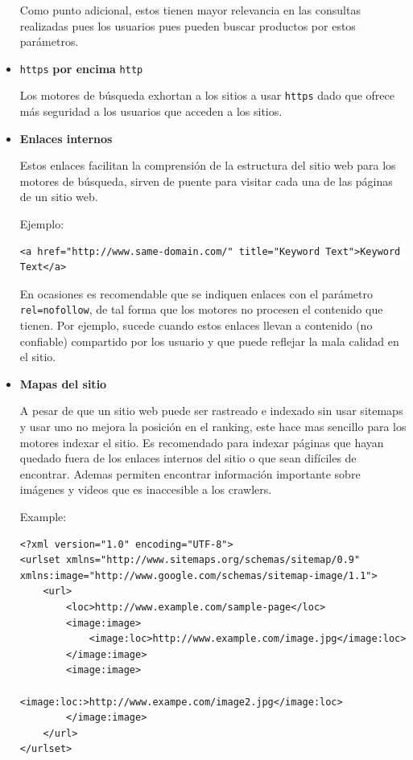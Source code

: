 \documentclass[12pt]{article}
\begin{document}
\begin{itemize}
Como punto adicional, estos tienen mayor relevancia en las consultas realizadas pues los usuarios pues pueden buscar productos por estos parámetros.

\item \verb+https+ \textbf{por encima} \verb+http+

Los motores de búsqueda exhortan a los sitios a usar \verb+https+ dado que ofrece más seguridad a los usuarios que acceden a los sitios.

\item \textbf{Enlaces internos}

Estos enlaces facilitan la comprensión de la estructura del sitio web para los motores de búsqueda, sirven de puente para visitar cada una de las páginas de un sitio web.

Ejemplo:
\begin{lstlisting}
<a href="http://www.same-domain.com/" title="Keyword Text">Keyword Text</a>    
\end{lstlisting}

En ocasiones es recomendable que se indiquen enlaces con el parámetro \verb+rel=nofollow+, de tal forma que los motores no procesen el contenido que tienen. Por ejemplo, sucede cuando estos enlaces llevan a contenido (no confiable) compartido por los usuario y que puede reflejar la mala calidad en el sitio.

\item \textbf{Mapas del sitio} \cite{sitemaps}

A pesar de que un sitio web puede ser rastreado e indexado sin usar sitemaps y usar uno no mejora la posición en el ranking, este hace mas sencillo para los motores indexar el sitio. Es recomendado para indexar páginas que hayan quedado fuera de los enlaces internos del sitio o que sean difíciles de encontrar. Ademas permiten encontrar información importante sobre imágenes y videos que es inaccesible a los crawlers.

Example:
\lstset{language=XML}
\begin{lstlisting}
<?xml version="1.0" encoding="UTF-8">
<urlset xmlns="http://www.sitemaps.org/schemas/sitemap/0.9" xmlns:image="http://www.google.com/schemas/sitemap-image/1.1">
    <url>
        <loc>http://www.example.com/sample-page</loc>
        <image:image>
            <image:loc>http://www.example.com/image.jpg</image:loc>
        </image:image>
        <image:image>
            <image:loc:>http://www.exampe.com/image2.jpg</image:loc>
        </image:image>
    </url>
</urlset>
\end{lstlisting}


\end{itemize}
\end{document}
